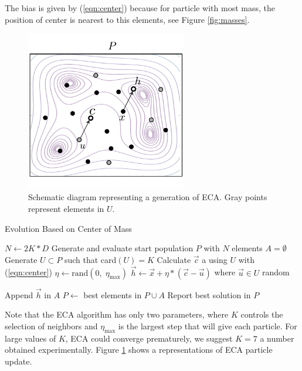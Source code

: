 \documentclass[graybox]{svmult}
\begin{document}
\begin{note}
The bias is given by (\ref{eqn:center}) because for particle with most mass, the 
position of center is nearest to this elements, see Figure \ref{fig:masses}.
\end{note}

\begin{figure}[!ht]
	\sidecaption
	\includegraphics[width=7cm]{img/ecaG.pdf}
	\caption{Schematic diagram representing a generation of ECA. Gray points 
	represent elements in $U$.}
	\label{fig:ecag}       %
\end{figure}

\begin{algorithm}[!ht]
	\caption{Evolution Based on Center of Mass}
	\label{algoritmoEca}
	\begin{algorithmic}[1]
		\State $N \gets 2K * D$
		\State Generate and evaluate start population $P$ with $N$ elements
			\State $A = \emptyset$
				\State Generate $U \subset P$ such that  card$(U) = K$
				\State Calculate $\vec{c}$ a using $U$ with (\ref{eqn:center})
				\State $\eta \gets \text{rand}(0,\; \eta_{\max}) $ 
				\State $\vec{h} \gets \vec{x} + \eta  * (\vec{c} - \vec{u}) $ where $ \vec{u} \in U $ random
				
					\State Append $\vec{h} $ in $A$
				\EndIf
			\EndFor
			\State $P \gets $ best elements in $P \cup A$
		\EndWhile
		\State Report best solution in $P$
		\EndProcedure
	\end{algorithmic}
\end{algorithm}

Note that the ECA algorithm has only two parameters, where $K$ controls the selection 
of neighbors and $\eta_{\max}$ is the largest step that will give each particle. 
For large values of $K$, ECA could converge prematurely, we suggest $K = 7$ a number 
obtained experimentally. Figure \ref{fig:ecag} shows a representations of ECA particle update. 
\end{document}
